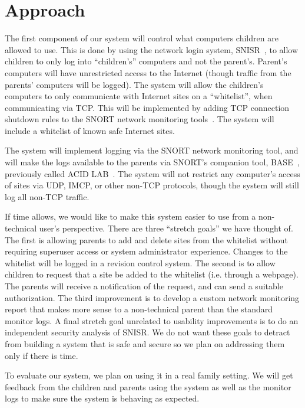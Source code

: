 \documentclass[12pt] {article}
\begin{document}
\section*{Approach}

The first component of our system will control what computers children are
allowed to use. This is done by using the network login system,
SNISR~\cite{snisr}, to allow children to only log into ``children's'' computers
and not the parent's.  Parent's computers will have unrestricted access to the
Internet (though traffic from the parents' computers will be logged). The
system will allow the children's computers to only communicate with Internet
sites on a ``whitelist'', when communicating via TCP.  This will be implemented
by adding TCP connection shutdown rules to the SNORT network monitoring
tools~\cite{snort}. The system will include a whitelist of known safe Internet
sites.

The system will implement logging via the SNORT network monitoring tool, and
will make the logs available to the parents via SNORT's companion tool,
BASE~\cite{base}, previously called ACID LAB~\cite{acidlab}. The system will
not restrict any computer's access of sites via UDP, IMCP, or other non-TCP
protocols, though the system will still log all non-TCP traffic.

If time allows, we would like to make this system easier to use from a
non-technical user's perspective. There are three ``stretch goals'' we have
thought of. The first is allowing parents to add and delete sites from the
whitelist without requiring superuser access or system administrator
experience. Changes to the whitelist will be logged in a revision control
system. The second is to allow children to request that a site be added to the
whitelist (i.e. through a webpage). The parents will receive a notification of
the request, and can send a suitable authorization. The third improvement is to
develop a custom network monitoring report that makes more sense to a
non-technical parent than the standard monitor logs. A final stretch goal
unrelated to usability improvements is to do an independent security analysis
of SNISR. We do not want these goals to detract from building a system that is
safe and secure so we plan on addressing them only if there is time.

To evaluate our system, we plan on using it in a real family setting. We will
get feedback from the children and parents using the system as well as the
monitor logs to make sure the system is behaving as expected.
\end{document}
